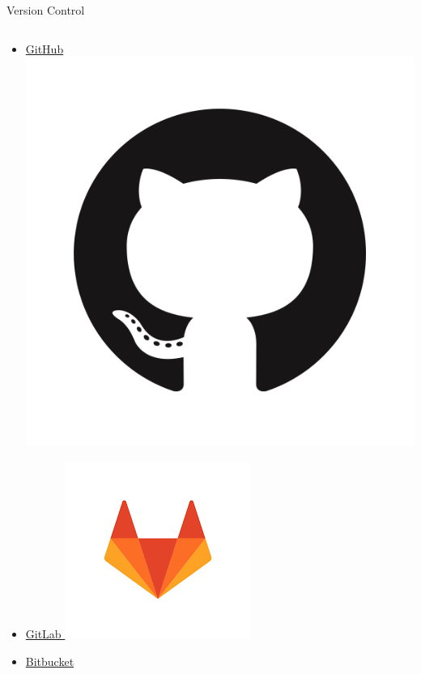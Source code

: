 \documentclass{beamer} %
\begin{document}
\begin{frame}{Version Control}
\begin{columns}
\begin{column}[t]{0.5\textwidth}
\begin{itemize}
          \item \href{https://github.com/}{GitHub \includegraphics[height=.05\textheight]{github.png}}
          \item \href{https://gitlab.com/}{GitLab \includegraphics[height=.05\textheight]{gitlab.png}}
          \item \href{https://bitbucket.org/}{Bitbucket}
        \end{itemize}
      \end{column}  
    \end{columns}
  \end{frame}
\end{document}
